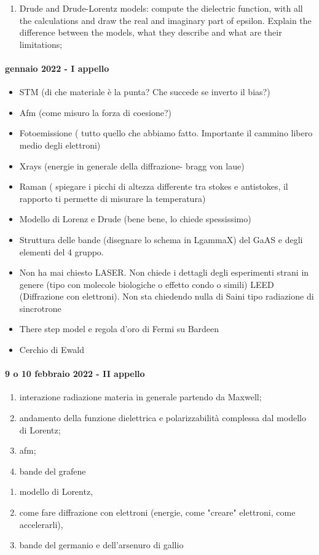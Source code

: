 \documentclass[../main.tex]{subfiles}
\begin{document}
\begin{enumerate}
    \item Drude and Drude-Lorentz models: compute the dielectric function, with all the calculations and draw the real and imaginary part of epsilon. Explain the difference between the models, what they describe and what are their limitations;
\end{enumerate}
\paragraph{gennaio 2022 - I appello}
\begin{itemize}
    \item STM (di che materiale è la punta? Che succede se inverto il bias?) 
\item Afm (come misuro la forza di coesione?) 
\item Fotoemissione ( tutto quello che abbiamo fatto. Importante il cammino libero medio degli elettroni) 
\item Xrays (energie in generale della diffrazione- bragg von laue) 
\item Raman ( spiegare i picchi di altezza differente tra stokes e antistokes, il rapporto ti permette di misurare la temperatura) 
\item Modello di Lorenz e Drude (bene bene, lo chiede spessissimo) 
\item Struttura delle bande (disegnare lo schema in LgammaX) del GaAS e degli elementi del 4 gruppo. 
\item Non ha mai chiesto LASER. Non chiede i dettagli degli esperimenti strani in genere (tipo con molecole biologiche o effetto condo o simili) 
LEED (Diffrazione con elettroni). Non sta chiedendo nulla di Saini tipo radiazione di sincrotrone 
\item There step model e regola d'oro di Fermi su Bardeen 
\item Cerchio di Ewald
\end{itemize}
\paragraph{9 o 10 febbraio 2022 - II appello}
\begin{enumerate}
    \item interazione radiazione materia in generale partendo da Maxwell; 
    \item andamento della funzione dielettrica e polarizzabilità complessa dal modello di Lorentz;
    \item afm;
    \item bande del grafene
\end{enumerate}
\begin{enumerate}
    \item modello di Lorentz, 
    \item come fare diffrazione con elettroni (energie, come "creare" elettroni, come accelerarli), 
    \item bande del germanio e dell'arsenuro di gallio
\end{enumerate}
\end{document}
